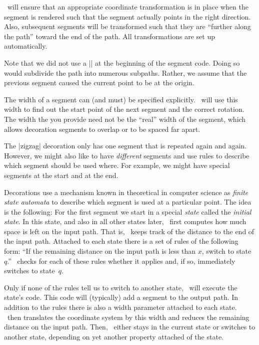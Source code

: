 \pgfname\ will ensure that an appropriate coordinate transformation
is in place when the segment is rendered such that
the segment actually points in the right direction. Also,
subsequent segments will be transformed such that they are
``further along the path'' toward the end of the path.
All transformations are set up automatically.

Note that we did not use a |\pgfpathmoveto{\pgfpointorigin}| at the
beginning of the segment code. Doing so would subdivide the path into
numerous subpaths. Rather, we assume that the previous segment caused
the current point to be at the origin.

The width of a segment can (and must) be specified
explicitly. \pgfname\ will use this width to find out the start point
of the next segment and the correct rotation. The width the you
provide need not be the ``real'' width of the segment, which allows
decoration segments to overlap or to be spaced far apart.

The |zigzag| decoration only has one segment that is repeated again and
again. However, we might also like to have \emph{different} segments
and use rules to describe which segment should be used where. For
example, we might have special segments at the start and at the end.

Decorations use a mechanism known in theoretical in computer science
as \emph{finite state automata} to describe which segment is used at a
particular point. The idea is the following: For the first segment we
start in a special \emph{state} called the \emph{initial state}. In
this state, and also in all other states later, \pgfname\ first
computes how much space is left on the input path. That is, \pgfname\ keeps
track of the distance to the end of the input path. Attached to each state
there is a set of rules of the following form: ``If the remaining
distance on the input path is less than $x$, switch to state~$q$.''
\pgfname\ checks for each of these rules whether it applies and, if
so, immediately switches to state~$q$.

Only if none of the rules tell us to switch to another
state, \pgfname\ will execute the state's code. This code will
(typically) add a segment to the output path. In addition to the rules
there is also a width parameter attached to each state. \pgfname\ then
translates the coordinate system by this width and reduces the
remaining distance on the input path. Then, \pgfname\ either stays in
the current state or switches to another state, depending on yet
another property attached of the state.


